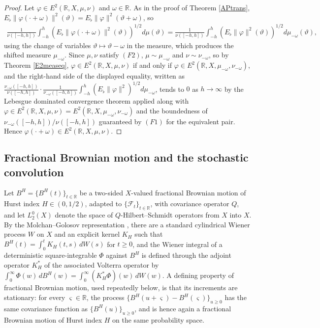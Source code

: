 \documentclass[11pt]{amsart}
\begin{document}
\begin{proof}
Let $\varphi\in E^2(\mathbb R,X,\mu,\nu)$ and $\omega\in\mathbb R$. As in the proof of Theorem \ref{APtrans}, $E_\flat\|\varphi(\cdot+\omega)\|^2(\vartheta)=E_\flat\|\varphi\|^2(\vartheta+\omega)$, so
\begin{align*}
\frac1{\nu([-h,h])}\int_{-h}^h(E_\flat\|\varphi(\cdot+\omega)\|^2(\vartheta))^{1/2}d\mu(\vartheta)
=\frac1{\nu([-h,h])}\int_{-h}^h(E_\flat\|\varphi\|^2(\vartheta))^{1/2}d\mu_{-\omega}(\vartheta),
\end{align*}
using the change of variables $\vartheta\mapsto\vartheta-\omega$ in the measure, which produces the shifted measure $\mu_{-\omega}$. Since $\mu,\nu$ satisfy $(F2)$, $\mu\sim\mu_{-\omega}$ and $\nu\sim\nu_{-\omega}$, so by Theorem \ref{E2measeq}, $\varphi\in E^2(\mathbb R,X,\mu,\nu)$ if and only if $\varphi\in E^2(\mathbb R,X,\mu_{-\omega},\nu_{-\omega})$, and the right-hand side of the displayed equality, written as $\frac{\nu_{-\omega}([-h,h])}{\nu([-h,h])}\cdot\frac1{\nu_{-\omega}([-h,h])}\int_{-h}^h(E_\flat\|\varphi\|^2)^{1/2}d\mu_{-\omega}$, tends to $0$ as $h\to\infty$ by the Lebesgue dominated convergence theorem applied along with $\varphi\in E^2(\mathbb R,X,\mu,\nu)=E^2(\mathbb R,X,\mu_{-\omega},\nu_{-\omega})$ and the boundedness of $\nu_{-\omega}([-h,h])/\nu([-h,h])$ guaranteed by $(F1)$ for the equivalent pair. Hence $\varphi(\cdot+\omega)\in E^2(\mathbb R,X,\mu,\nu)$.
\end{proof}

\subsection{Fractional Brownian motion and the stochastic convolution}

Let $B^H=\{B^H(t)\}_{t\in\mathbb R}$ be a two-sided $X$-valued fractional Brownian motion of Hurst index $H\in(0,1/2)$, adapted to $\{\mathcal F_t\}_{t\in\mathbb R}$, with covariance operator $Q$, and let $L^0_2(X)$ denote the space of $Q$-Hilbert--Schmidt operators from $X$ into $X$. By the Molchan--Golosov representation \cite{MolchanGolosov}, there are a standard cylindrical Wiener process $W$ on $X$ and an explicit kernel $K_H$ such that $B^H(t)=\int_0^tK_H(t,s)\,dW(s)$ for $t\ge0$, and the Wiener integral of a deterministic square-integrable $\Phi$ against $B^H$ is defined through the adjoint operator $K_H^\ast$ of the associated Volterra operator by $\int_0^\infty\Phi(w)\,dB^H(w)=\int_0^\infty(K_H^\ast\Phi)(w)\,dW(w)$. A defining property of fractional Brownian motion, used repeatedly below, is that its increments are stationary: for every $\varsigma\in\mathbb R$, the process $\{B^H(u+\varsigma)-B^H(\varsigma)\}_{u\ge0}$ has the same covariance function as $\{B^H(u)\}_{u\ge0}$, and is hence again a fractional Brownian motion of Hurst index $H$ on the same probability space.
\end{document}
